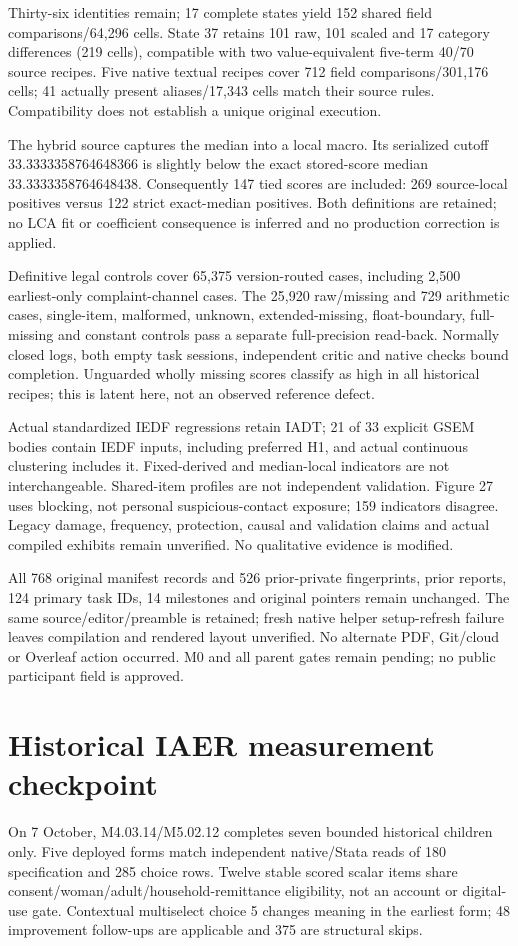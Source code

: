 \documentclass[11pt,a4paper]{article}
\begin{document}
Thirty-six identities remain; 17 complete states yield 152 shared
field comparisons/64,296 cells. State 37 retains 101 raw, 101 scaled
and 17 category differences (219 cells), compatible with two
value-equivalent five-term 40/70 source recipes.
Five native textual recipes cover 712 field comparisons/301,176 cells;
41 actually present aliases/17,343 cells match their source rules.
Compatibility does not establish a unique original execution.

The hybrid source captures the median into a local macro.
Its serialized cutoff 33.3333358764648366 is slightly below
the exact stored-score median 33.3333358764648438.
Consequently 147 tied scores are included: 269 source-local
positives versus 122 strict exact-median positives.
Both definitions are retained; no LCA fit or coefficient consequence
is inferred and no production correction is applied.

Definitive legal controls cover 65,375 version-routed cases,
including 2,500 earliest-only complaint-channel cases.
The 25,920 raw/missing and 729 arithmetic cases, single-item,
malformed, unknown, extended-missing, float-boundary,
full-missing and constant controls pass a separate full-precision
read-back. Normally closed logs, both empty task sessions,
independent critic and native checks bound completion.
Unguarded wholly missing scores classify as high in all historical
recipes; this is latent here, not an observed reference defect.

Actual standardized IEDF regressions retain IADT; 21 of 33
explicit GSEM bodies contain IEDF inputs, including preferred H1,
and actual continuous clustering includes it.
Fixed-derived and median-local indicators are not interchangeable.
Shared-item profiles are not independent validation.
Figure 27 uses blocking, not personal suspicious-contact exposure;
159 indicators disagree. Legacy damage, frequency, protection,
causal and validation claims and actual compiled exhibits remain
unverified. No qualitative evidence is modified.

All 768 original manifest records and 526 prior-private fingerprints,
prior reports, 124 primary task IDs, 14 milestones and original
pointers remain unchanged. The same source/editor/preamble is retained;
fresh native helper setup-refresh failure leaves compilation and
rendered layout unverified. No alternate PDF, Git/cloud or
Overleaf action occurred. M0 and all parent gates remain pending;
no public participant field is approved.

\section{Historical IAER measurement checkpoint}
On 7 October, M4.03.14/M5.02.12 completes seven bounded historical
children only. Five deployed forms match independent native/Stata
reads of 180 specification and 285 choice rows. Twelve stable scored
scalar items share consent/woman/adult/household-remittance eligibility,
not an account or digital-use gate. Contextual multiselect choice 5
changes meaning in the earliest form; 48 improvement follow-ups are
applicable and 375 are structural skips.
\end{document}
